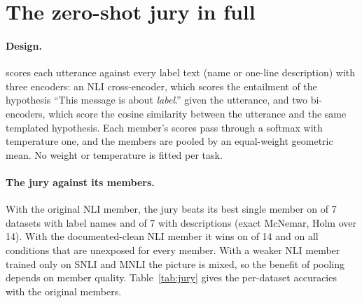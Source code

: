 \section{The zero-shot jury in full}
\label{app:jury}

\paragraph{Design.} \gj{} scores each utterance against every label text (name or one-line description) with three
encoders: an NLI cross-encoder, which scores the entailment of the hypothesis ``This message is about
\emph{label}.'' given the utterance, and two bi-encoders, which score the cosine similarity between the utterance and
the same templated hypothesis. Each member's scores pass through a softmax with temperature one, and the members are pooled by an
equal-weight geometric mean. No weight or temperature is fitted per task.

\paragraph{The jury against its members.} With the original NLI member, the jury beats its best single member on
\zsWinsNames{} of 7 datasets with label names and \zsWinsDesc{} of 7 with descriptions (exact McNemar, Holm over
14). With the documented-clean NLI member it wins on \zxCleanNliWins{} of 14 and on all
\zxCleanNliUnexposedOf{} conditions that are unexposed for every member. With a weaker NLI member trained only on
SNLI and MNLI the picture is mixed, so the benefit of pooling depends on member quality.
Table~\ref{tab:jury} gives the per-dataset accuracies with the original members.

